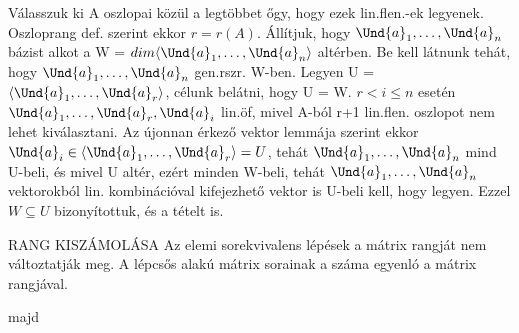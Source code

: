 \begin{bizonyitas}{}
Válasszuk ki A oszlopai közül a legtöbbet őgy, hogy ezek lin.flen.-ek legyenek. Oszloprang def. szerint ekkor $r = r(A)$. Állítjuk, hogy $\Und{a}_1, \ldots, \Und{a}_n$ bázist alkot a W = $dim\langle\Und{a}_1, \ldots, \Und{a}_n\rangle$ altérben. Be kell látnunk tehát, hogy $\Und{a}_1, \ldots, \Und{a}_n$ gen.rszr. W-ben. Legyen U = $\langle\Und{a}_1, \ldots, \Und{a}_r\rangle$, célunk belátni, hogy U = W. $r < i \leq n$ esetén $\Und{a}_1, \ldots, \Und{a}_r, \Und{a}_i$ lin.öf, mivel A-ból r+1 lin.flen. oszlopot nem lehet kiválasztani. Az újonnan érkező vektor lemmája szerint ekkor $\Und{a}_i\in\langle\Und{a}_1, \ldots, \Und{a}_r\rangle = U$, tehát $\Und{a}_1, \ldots, \Und{a}_n$ mind U-beli, és mivel U altér, ezért minden W-beli, tehát $\Und{a}_1, \ldots, \Und{a}_n$ vektorokból lin. kombinációval kifejezhető vektor is U-beli kell, hogy legyen. Ezzel $W \subseteq U$ bizonyítottuk, és a tételt is.
\end{bizonyitas}

\begin{tetel}{RANG KISZÁMOLÁSA}
Az elemi sorekvivalens lépések a mátrix rangját nem változtatják meg. A lépcsős alakú mátrix sorainak a száma egyenló a mátrix rangjával.
\end{tetel}

\begin{bizonyitas}{}
majd
\end{bizonyitas}

